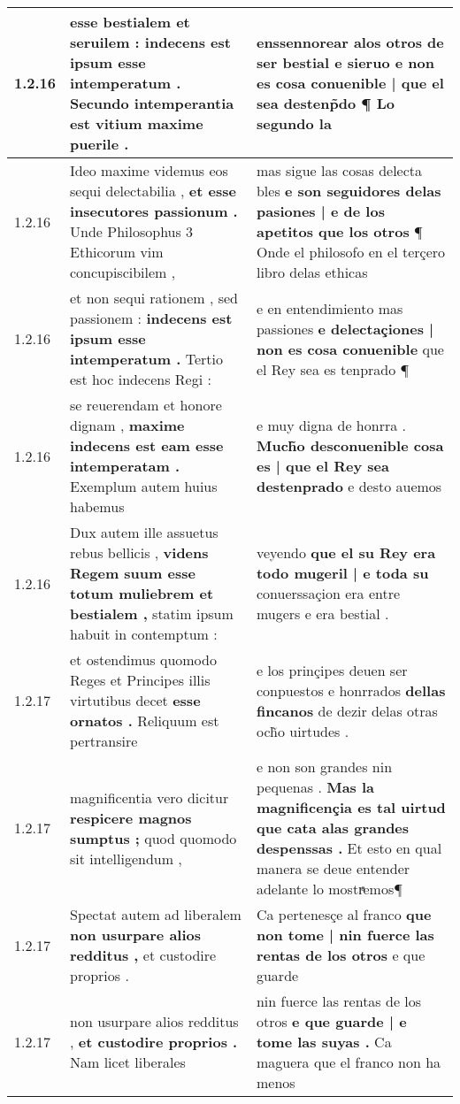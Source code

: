 \begin{tabular}{|p{1cm}|p{6.5cm}|p{6.5cm}|}
1.2.16 & esse bestialem et seruilem : \textbf{ indecens est ipsum esse intemperatum . } Secundo intemperantia est vitium maxime puerile . & enssennorear alos otros de ser bestial e sieruo \textbf{ e non es cosa conuenible | que el sea destenp̃do ¶ } Lo segundo la \\\hline
1.2.16 & Ideo maxime videmus eos sequi delectabilia , \textbf{ et esse insecutores passionum . } Unde Philosophus 3 Ethicorum vim concupiscibilem , & mas sigue las cosas delecta bles \textbf{ e son seguidores delas pasiones | e de los apetitos que los otros } ¶ Onde el philosofo en el terçero libro delas ethicas \\\hline
1.2.16 & et non sequi rationem , sed passionem : \textbf{ indecens est ipsum esse intemperatum . } Tertio est hoc indecens Regi : & e en entendimiento mas passiones \textbf{ e delectaçiones | non es cosa conuenible } que el Rey sea es tenprado ¶ \\\hline
1.2.16 & se reuerendam et honore dignam , \textbf{ maxime indecens est eam esse intemperatam . } Exemplum autem huius habemus & e muy digna de honrra . \textbf{ Much̃o desconuenible cosa es | que el Rey sea destenprado } e desto auemos \\\hline
1.2.16 & Dux autem ille assuetus rebus bellicis , \textbf{ videns Regem suum esse totum muliebrem et bestialem , } statim ipsum habuit in contemptum : & veyendo \textbf{ que el su Rey era todo mugeril | e toda su } conuerssaçion era entre mugers e era bestial . \\\hline
1.2.17 & et ostendimus quomodo Reges et Principes illis virtutibus decet \textbf{ esse ornatos . } Reliquum est pertransire & e los prinçipes deuen ser conpuestos e honrrados \textbf{ dellas fincanos } de dezir delas otras och̃o uirtudes . \\\hline
1.2.17 & magnificentia vero dicitur \textbf{ respicere magnos sumptus ; } quod quomodo sit intelligendum , & e non son grandes nin pequenas . \textbf{ Mas la magnificençia es tal uirtud que cata alas grandes despenssas . } Et esto en qual manera se deue entender adelante lo mostrͣemos¶ \\\hline
1.2.17 & Spectat autem ad liberalem \textbf{ non usurpare alios redditus , } et custodire proprios . & Ca pertenesçe al franco \textbf{ que non tome | nin fuerce las rentas de los otros } e que guarde \\\hline
1.2.17 & non usurpare alios redditus , \textbf{ et custodire proprios . } Nam licet liberales & nin fuerce las rentas de los otros \textbf{ e que guarde | e tome las suyas . } Ca maguera que el franco non ha menos \\\hline

\end{tabular}
